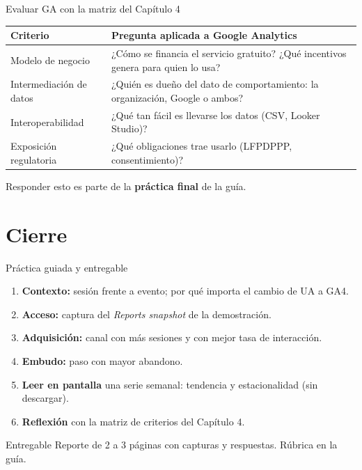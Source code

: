 \documentclass[aspectratio=169,xcolor=dvipsnames]{beamer}
\begin{document}
\begin{frame}{Evaluar GA con la matriz del Capítulo 4}
\footnotesize
\begin{center}
\begin{tabular}{@{}>{\raggedright}p{3.2cm}>{\raggedright\arraybackslash}p{8.4cm}@{}}
\toprule
\textbf{Criterio} & \textbf{Pregunta aplicada a Google Analytics} \\
\midrule
Modelo de negocio & ¿Cómo se financia el servicio gratuito? ¿Qué incentivos genera para quien lo usa? \\
Intermediación de datos & ¿Quién es dueño del dato de comportamiento: la organización, Google o ambos? \\
Interoperabilidad & ¿Qué tan fácil es llevarse los datos (CSV, Looker Studio)? \\
Exposición regulatoria & ¿Qué obligaciones trae usarlo (LFPDPPP, consentimiento)? \\
\bottomrule
\end{tabular}
\end{center}
\begin{center}\scriptsize Responder esto es parte de la \textbf{práctica final} de la guía.\end{center}
\end{frame}

\section{Cierre}

\begin{frame}{Práctica guiada y entregable}
\small
\begin{enumerate}
  \item \textbf{Contexto:} sesión frente a evento; por qué importa el cambio de UA a GA4.
  \item \textbf{Acceso:} captura del \textit{Reports snapshot} de la demostración.
  \item \textbf{Adquisición:} canal con más sesiones y con mejor tasa de interacción.
  \item \textbf{Embudo:} paso con mayor abandono.
  \item \textbf{Leer en pantalla} una serie semanal: tendencia y estacionalidad (sin descargar).
  \item \textbf{Reflexión} con la matriz de criterios del Capítulo 4.
\end{enumerate}
\begin{alertblock}{Entregable}
  \scriptsize Reporte de 2 a 3 páginas con capturas y respuestas. Rúbrica en la guía.
\end{alertblock}
\end{frame}
\end{document}
